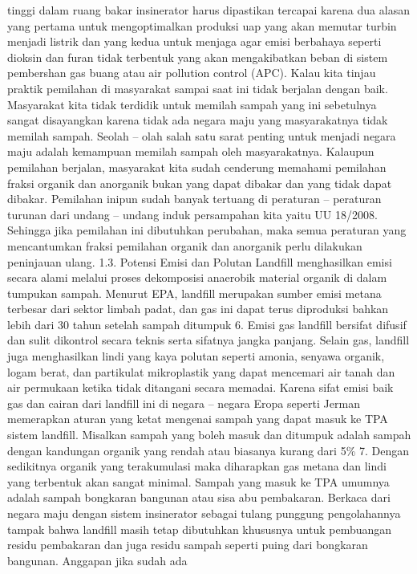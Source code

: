 \documentclass[
  letterpaper,
  DIV=11,
  numbers=noendperiod]{scrreprt}
\begin{document}
tinggi dalam ruang bakar insinerator harus dipastikan tercapai karena
dua alasan yang pertama untuk mengoptimalkan produksi uap yang akan
memutar turbin menjadi listrik dan yang kedua untuk menjaga agar emisi
berbahaya seperti dioksin dan furan tidak terbentuk yang akan
mengakibatkan beban di sistem pembershan gas buang atau air pollution
control (APC). Kalau kita tinjau praktik pemilahan di masyarakat sampai
saat ini tidak berjalan dengan baik. Masyarakat kita tidak terdidik
untuk memilah sampah yang ini sebetulnya sangat disayangkan karena tidak
ada negara maju yang masyarakatnya tidak memilah sampah. Seolah -- olah
salah satu sarat penting untuk menjadi negara maju adalah kemampuan
memilah sampah oleh masyarakatnya. Kalaupun pemilahan berjalan,
masyarakat kita sudah cenderung memahami pemilahan fraksi organik dan
anorganik bukan yang dapat dibakar dan yang tidak dapat dibakar.
Pemilahan inipun sudah banyak tertuang di peraturan -- peraturan turunan
dari undang -- undang induk persampahan kita yaitu UU 18/2008. Sehingga
jika pemilahan ini dibutuhkan perubahan, maka semua peraturan yang
mencantumkan fraksi pemilahan organik dan anorganik perlu dilakukan
peninjauan ulang. 1.3. Potensi Emisi dan Polutan Landfill menghasilkan
emisi secara alami melalui proses dekomposisi anaerobik material organik
di dalam tumpukan sampah. Menurut EPA, landfill merupakan sumber emisi
metana terbesar dari sektor limbah padat, dan gas ini dapat terus
diproduksi bahkan lebih dari 30 tahun setelah sampah ditumpuk 6. Emisi
gas landfill bersifat difusif dan sulit dikontrol secara teknis serta
sifatnya jangka panjang. Selain gas, landfill juga menghasilkan lindi
yang kaya polutan seperti amonia, senyawa organik, logam berat, dan
partikulat mikroplastik yang dapat mencemari air tanah dan air permukaan
ketika tidak ditangani secara memadai. Karena sifat emisi baik gas dan
cairan dari landfill ini di negara -- negara Eropa seperti Jerman
memerapkan aturan yang ketat mengenai sampah yang dapat masuk ke TPA
sistem landfill. Misalkan sampah yang boleh masuk dan ditumpuk adalah
sampah dengan kandungan organik yang rendah atau biasanya kurang dari
5\% 7. Dengan sedikitnya organik yang terakumulasi maka diharapkan gas
metana dan lindi yang terbentuk akan sangat minimal. Sampah yang masuk
ke TPA umumnya adalah sampah bongkaran bangunan atau sisa abu
pembakaran. Berkaca dari negara maju dengan sistem insinerator sebagai
tulang punggung pengolahannya tampak bahwa landfill masih tetap
dibutuhkan khususnya untuk pembuangan residu pembakaran dan juga residu
sampah seperti puing dari bongkaran bangunan. Anggapan jika sudah ada
\end{document}
